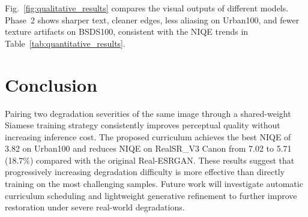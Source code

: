 \documentclass[runningheads]{llncs}
\begin{document}
Fig.~\ref{fig:qualitative_results} compares the visual outputs of different models. 
Phase~2 shows sharper text, cleaner edges, less aliasing on Urban100, and fewer texture artifacts on BSDS100, consistent with the NIQE trends in Table~\ref{tab:quantitative_results}.



\section{Conclusion}
Pairing two degradation severities of the same image through a shared-weight Siamese training strategy consistently improves perceptual quality without increasing inference cost. The proposed curriculum achieves the best NIQE of 3.82 on Urban100 and reduces NIQE on RealSR\_V3 Canon from 7.02 to 5.71 (18.7\%) compared with the original Real-ESRGAN. These results suggest that progressively increasing degradation difficulty is more effective than directly training on the most challenging samples. Future work will investigate automatic curriculum scheduling and lightweight generative refinement to further improve restoration under severe real-world degradations.




\end{document}

